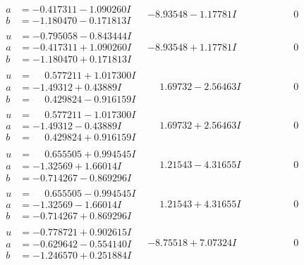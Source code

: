 \documentclass[1p]{elsarticle_modified}
\theoremstyle{definition}
\begin{document}
$$\begin{array}{c|c|c}
\begin{aligned}
a &= -0.417311 - 1.090260 I \\
b &= -1.180470 - 0.171813 I\end{aligned}
 & -8.93548 - 1.17781 I & \phantom{-0.000000 } 0 \\ \hline\begin{aligned}
u &= -0.795058 - 0.843444 I \\
a &= -0.417311 + 1.090260 I \\
b &= -1.180470 + 0.171813 I\end{aligned}
 & -8.93548 + 1.17781 I & \phantom{-0.000000 } 0 \\ \hline\begin{aligned}
u &= \phantom{-}0.577211 + 1.017300 I \\
a &= -1.49312 + 0.43889 I \\
b &= \phantom{-}0.429824 - 0.916159 I\end{aligned}
 & \phantom{-}1.69732 - 2.56463 I & \phantom{-0.000000 } 0 \\ \hline\begin{aligned}
u &= \phantom{-}0.577211 - 1.017300 I \\
a &= -1.49312 - 0.43889 I \\
b &= \phantom{-}0.429824 + 0.916159 I\end{aligned}
 & \phantom{-}1.69732 + 2.56463 I & \phantom{-0.000000 } 0 \\ \hline\begin{aligned}
u &= \phantom{-}0.655505 + 0.994545 I \\
a &= -1.32569 + 1.66014 I \\
b &= -0.714267 - 0.869296 I\end{aligned}
 & \phantom{-}1.21543 - 4.31655 I & \phantom{-0.000000 } 0 \\ \hline\begin{aligned}
u &= \phantom{-}0.655505 - 0.994545 I \\
a &= -1.32569 - 1.66014 I \\
b &= -0.714267 + 0.869296 I\end{aligned}
 & \phantom{-}1.21543 + 4.31655 I & \phantom{-0.000000 } 0 \\ \hline\begin{aligned}
u &= -0.778721 + 0.902615 I \\
a &= -0.629642 - 0.554140 I \\
b &= -1.246570 + 0.251884 I\end{aligned}
 & -8.75518 + 7.07324 I & \phantom{-0.000000 } 0 \\ \hline\begin{aligned}

\end{aligned}
\end{array}$$
\end{document}
